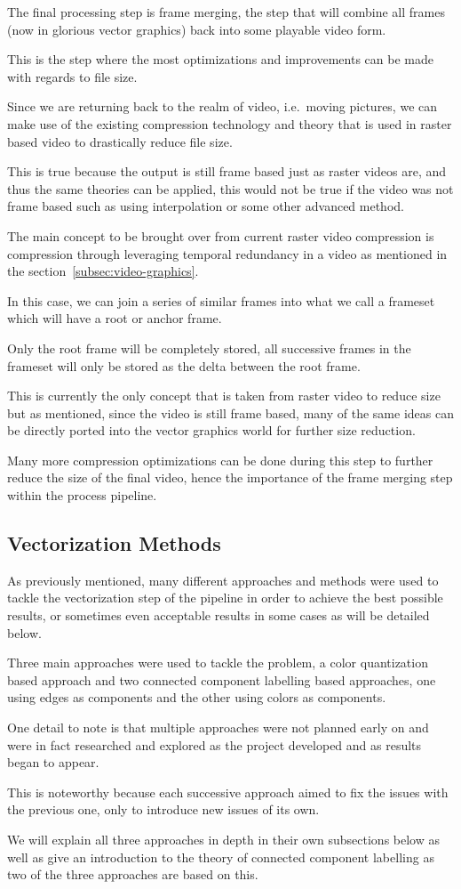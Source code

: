 \documentclass[12pt]{article}
\newcommand{\sentence}{} %
\renewcommand{\fullref}[1]{\ref{#1}\nameref{#1}}
\begin{document}
    \tab
    The final processing step is frame merging, the step that will combine all frames (now in glorious vector
    graphics) back into some playable video form.
    \sentence
    This is the step where the most optimizations and improvements can be made with regards to file size.
    \sentence
    Since we are returning back to the realm of video, i.e.\ moving pictures, we can make use of the existing
    compression technology and theory that is used in raster based video to drastically reduce file size.
    \sentence
    This is true because the output is still frame based just as raster videos are, and thus the same theories can be
    applied, this would not be true if the video was not frame based such as using interpolation or some other
    advanced method.
    \sentence
    The main concept to be brought over from current raster video compression is compression through leveraging
    temporal redundancy in a video as mentioned in the section~\fullref{subsec:video-graphics}.
    \sentence
    In this case, we can join a series of similar frames into what we call a frameset which will have a root
    or anchor frame.
    \sentence
    Only the root frame will be completely stored, all successive frames in the frameset will only be stored as the
    delta between the root frame.
    \sentence
    This is currently the only concept that is taken from raster video to reduce size but as mentioned, since the
    video is still frame based, many of the same ideas can be directly ported into the vector graphics world for
    further size reduction.
    \sentence
    Many more compression optimizations can be done during this step to further reduce the size of the final
    video, hence the importance of the frame merging step within the process pipeline.


    \subsection{Vectorization Methods}\label{subsec:vectorization-methods}

    \tab
    As previously mentioned, many different approaches and methods were used to tackle the vectorization step of the
    pipeline in order to achieve the best possible results, or sometimes even acceptable results in some cases as
    will be detailed below.
    \sentence
    Three main approaches were used to tackle the problem, a color quantization based approach and two connected
    component labelling based approaches, one using edges as components and the other using colors as components.
    \sentence
    One detail to note is that multiple approaches were not planned early on and were in fact researched and explored
    as the project developed and as results began to appear.
    \sentence
    This is noteworthy because each successive approach aimed to fix the issues with the previous one, only to
    introduce new issues of its own.
    \sentence
    We will explain all three approaches in depth in their own subsections below as well as give an introduction to
    the theory of connected component labelling as two of the three approaches are based on this.
\end{document}
